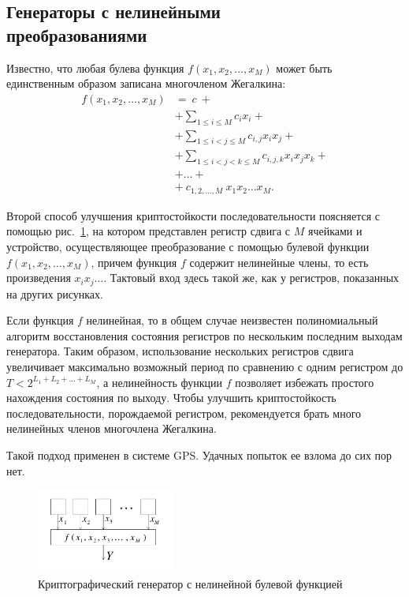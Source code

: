 \subsection[Генераторы с нелинейными преобразованиями]{Генераторы с нелинейными \protect\\ преобразованиями}

Известно, что любая булева функция $f(x_1, x_2,  \dots, x_M)$ может быть единственным образом записана многочленом Жегалкина:
\[ \begin{array}{ll}
    f(x_1, x_2, \dots, x_M) & = ~c~ + \\
    & + \sum\limits_{1 \leq i \leq M} c_i x_i + \\
    & + \sum\limits_{1 \leq i < j \leq M} c_{i,j} x_i x_j + \\
    & + \sum\limits_{1 \leq i < j < k \leq M} c_{i,j,k} x_i x_j x_k + \\
    & + \dots + \\
    & + ~ c_{1,2,\dots,M} ~ x_1 x_2 \dots x_M.
\end{array} \]


Второй способ улучшения криптостойкости последовательности поясняется с помощью рис.~\ref{fig:lfsr-zhegalkin}, на котором представлен регистр сдвига с $M$ ячейками и устройство, осуществляющее преобразование с помощью булевой функции $f(x_1, x_2, \dots, x_M)$, причем функция $f$ содержит нелинейные члены, то есть произведения $x_i x_j \dots$. Тактовый вход здесь такой же, как у регистров, показанных на других рисунках.

Если функция $f$ нелинейная, то в общем случае неизвестен полиномиальный алгоритм восстановления состояния регистров по нескольким последним выходам генератора. Таким образом, использование нескольких регистров сдвига увеличивает максимально возможный период по сравнению с одним регистром до $T < 2^{L_1 + L_2 + \dots + L_M}$, а нелинейность функции $f$ позволяет избежать простого нахождения состояния по выходу. Чтобы улучшить криптостойкость последовательности, порождаемой регистром, рекомендуется брать много нелинейных членов многочлена Жегалкина.

Такой подход применен в системе GPS. Удачных попыток ее взлома до сих пор нет.

\begin{figure}[!ht]
    \centering
	\includegraphics[width=0.4\textwidth]{pic/lfsr-zhegalkin}
    \caption{Криптографический генератор с нелинейной булевой функцией\label{fig:lfsr-zhegalkin}}
\end{figure}
